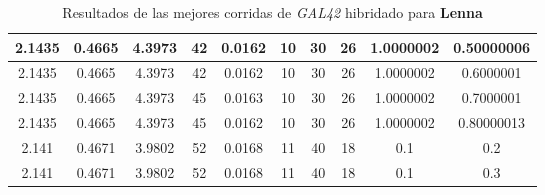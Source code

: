 \begin{table}[h!]
\begin{center}
\begin{tabular}{|c|c|c|c|c|c|c|c|c|c|}
        \hline
        \hline
            2.1435 & 0.4665  & 4.3973 & 42 & 0.0162 & 10 & 30 & 26 & 1.0000002 & 0.50000006\\
        \hline
        \hline
            2.1435 & 0.4665  & 4.3973 & 42 & 0.0162 & 10 & 30 & 26 & 1.0000002 & 0.6000001\\
        \hline
        \hline
            2.1435 & 0.4665  & 4.3973 & 45 & 0.0163 & 10 & 30 & 26 & 1.0000002 & 0.7000001\\
        \hline
        \hline
            2.1435 & 0.4665  & 4.3973 & 45 & 0.0162 & 10 & 30 & 26 & 1.0000002 & 0.80000013\\
        \hline
        \hline
            2.141 & 0.4671  & 3.9802 & 52 & 0.0168 & 11 & 40 & 18 & 0.1 & 0.2\\
        \hline
        \hline
            2.141 & 0.4671  & 3.9802 & 52 & 0.0168 & 11 & 40 & 18 & 0.1 & 0.3\\
        \hline
        \end{tabular}
        \caption{Resultados de las mejores corridas de \emph{GAL42} hibridado para {\bf Lenna}}
        \label{tb:tableGAL42}
    \end{center}
\end{table}

